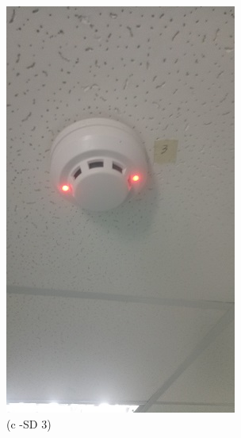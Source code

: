 \begin{figure}
\begin{minipage}[b]{0.2\linewidth}
			\includegraphics[width=\textwidth]{figures/R1P_fdas/SD3.jpg}
		\caption*{(c -SD 3)}
	\end{minipage}
	\hspace{0.05cm}
\begin{minipage}[b]{0.25\linewidth}
	\centering

\end{minipage}
\end{figure}
